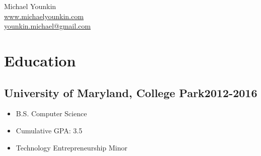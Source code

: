 \documentclass{article}
\newcommand{\subsectiondate}[2]{\subsection*{#1\hfill#2}}
\begin{document}
\begin{center}
    {\LARGE Michael Younkin}\\
    \href{http://www.michaelyounkin.com}{www.michaelyounkin.com}\\
    \href{mailto:younkin.michael@gmail.com}{younkin.michael@gmail.com}
\end{center}

\section*{Education}

\subsectiondate{University of Maryland, College Park}{2012-2016}

\begin{itemize}
    \item B.S. Computer Science
    \item Cumulative GPA: 3.5
    \item Technology Entrepreneurship Minor
\end{itemize}
\end{document}
